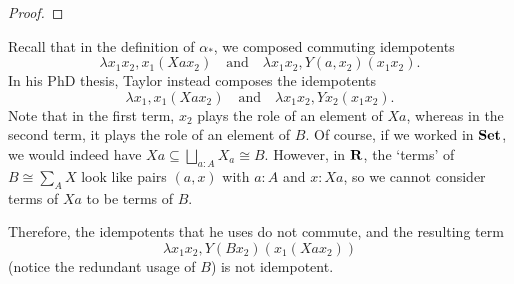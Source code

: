 \begin{proof}
\end{proof}

\begin{remark}
  Recall that in the definition of $ \alpha_* $, we composed commuting idempotents
  \[ \lambda x_1 x_2, x_1 (X a x_2) \quad \text{and} \quad \lambda x_1 x_2, Y (a, x_2) (x_1 x_2). \]
  In his PhD thesis, Taylor instead composes the idempotents
  \[ \lambda x_1, x_1 (X a x_2) \quad \text{and} \quad \lambda x_1 x_2, Y x_2 (x_1 x_2). \]
  Note that in the first term, $ x_2 $ plays the role of an element of $ X a $, whereas in the second term, it plays the role of an element of $ B $. Of course, if we worked in $ \mathbf{Set} $, we would indeed have $ X a \subseteq \bigsqcup_{a : A} X_a \cong B $. However, in $ \mathbf{R} $, the `terms' of $ B \cong \sum_A X $ look like pairs $ (a, x) $ with $ a : A $ and $ x : X a $, so we cannot consider terms of $ X a $ to be terms of $ B $.

  Therefore, the idempotents that he uses do not commute, and the resulting term
  \[ \lambda x_1 x_2, Y (B x_2) (x_1 (X a x_2)) \]
  (notice the redundant usage of $ B $) is not idempotent.
\end{remark}
